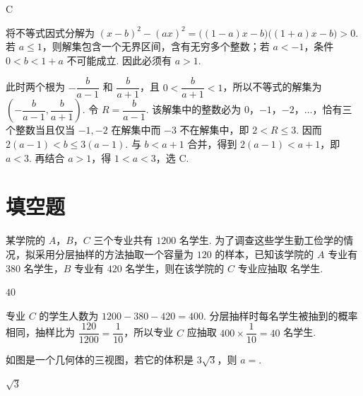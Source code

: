 \begin{answer}
C
\end{answer}

\begin{solution}
将不等式因式分解为
\((x-b)^2-(ax)^2=\bigl((1-a)x-b\bigr)\bigl((1+a)x-b\bigr)>0\).
若 \(a\leqslant1\)，则解集包含一个无界区间，含有无穷多个整数；若 \(a<-1\)，条件 \(0<b<1+a\) 不可能成立. 因此必须有 \(a>1\).

此时两个根为 \(-\dfrac{b}{a-1}\) 和 \(\dfrac{b}{a+1}\)，且 \(0<\dfrac{b}{a+1}<1\)，所以不等式的解集为
\(\left(-\dfrac{b}{a-1},\dfrac{b}{a+1}\right)\).
令 \(R=\dfrac{b}{a-1}\). 该解集中的整数必为 \(0\)，\(-1\)，\(-2\)，\(\ldots\)，恰有三个整数当且仅当 \(-1,-2\) 在解集中而 \(-3\) 不在解集中，即 \(2<R\leqslant3\). 因而 \(2(a-1)<b\leqslant3(a-1)\). 与 \(b<a+1\) 合并，得到 \(2(a-1)<a+1\)，即 \(a<3\). 再结合 \(a>1\)，得 \(1<a<3\)，选 C.
\end{solution}

\section{填空题}

\begin{problem}
某学院的 \(A\)，\(B\)，\(C\) 三个专业共有 \(1200\) 名学生. 为了调查这些学生勤工俭学的情况，拟采用分层抽样的方法抽取一个容量为 \(120\) 的样本，已知该学院的 \(A\) 专业有 \(380\) 名学生，\(B\) 专业有 \(420\) 名学生，则在该学院的 \(C\) 专业应抽取\fillinblank{} 名学生.
\end{problem}

\begin{answer}
\(40\)
\end{answer}

\begin{solution}
专业 \(C\) 的学生人数为 \(1200-380-420=400\). 分层抽样时每名学生被抽到的概率相同，抽样比为 \(\dfrac{120}{1200}=\dfrac1{10}\)，所以专业 \(C\) 应抽取 \(400\times\dfrac1{10}=40\) 名学生.
\end{solution}

\begin{problem}
如图是一个几何体的三视图，若它的体积是 \(3 \sqrt{3}\)，则 \(a =\)\fillinblank{}.

\end{problem}

\begin{answer}
\(\sqrt{3}\)
\end{answer}

